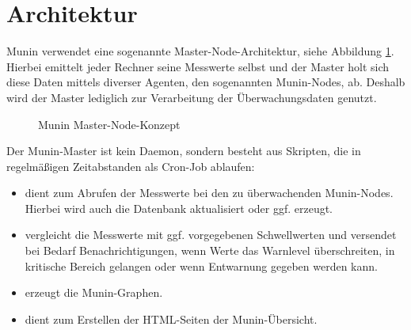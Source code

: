 \section{Architektur}

Munin verwendet eine sogenannte Master-Node-Architektur, siehe Abbildung \ref{master-munin}.
Hierbei emittelt jeder Rechner seine Messwerte selbst und der Master holt sich diese Daten mittels diverser Agenten, den sogenannten Munin-Nodes, ab.
Deshalb wird der Master lediglich zur Verarbeitung der Überwachungsdaten genutzt.

\begin{figure}[ht]
	\centering
		\caption{Munin Master-Node-Konzept}
		\label{master-munin}
\end{figure}

Der Munin-Master ist kein Daemon, sondern besteht aus Skripten, die in regelmäßigen Zeitabstanden als Cron-Job ablaufen:
\begin{itemize}
\item {} dient zum Abrufen der Messwerte bei den zu überwachenden Munin-Nodes. Hierbei wird auch die Datenbank aktualisiert oder ggf. erzeugt.
\item {} vergleicht die Messwerte mit ggf. vorgegebenen Schwellwerten und versendet bei Bedarf Benachrichtigungen, wenn Werte das Warnlevel überschreiten, in kritische Bereich gelangen oder wenn Entwarnung gegeben werden kann.
\item {} erzeugt die Munin-Graphen.
\item {} dient zum Erstellen der HTML-Seiten der Munin-Übersicht.
\end{itemize}


